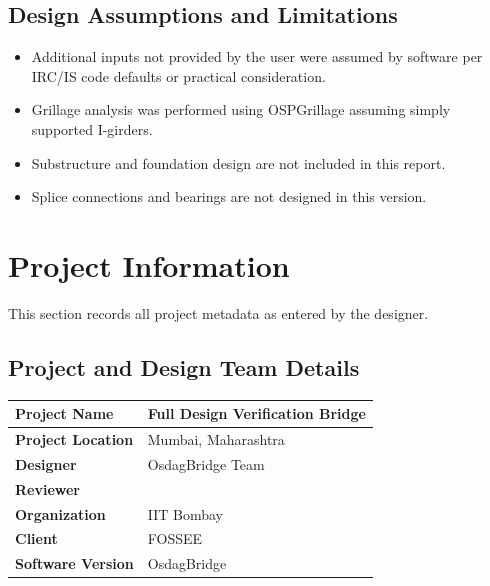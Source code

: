\documentclass[12pt,a4paper]{report}
\numberwithin{table}{chapter}
\numberwithin{figure}{chapter}
\begin{document}
\section*{Design Assumptions and Limitations}
\label{sec:assumptions}

\begin{itemize}
\item Additional inputs not provided by the user were assumed by software per IRC/IS code defaults or practical consideration.
\item Grillage analysis was performed using OSPGrillage assuming simply supported I-girders.
\item Substructure and foundation design are not included in this report.
\item Splice connections and bearings are not designed in this version.
\end{itemize}

\titleformat{\chapter}[block]{\normalfont\Large\bfseries\centering}{\thechapter}{1em}{}
\titlespacing*{\chapter}{0pt}{-30pt}{10pt}


\chapter{Project Information}

This section records all project metadata as entered by the designer.

\section{Project and Design Team Details}
\label{sec:project-details}

\vspace{0.4cm}
\begin{tabular}{|L{5.5cm}|L{8.5cm}|}
\hline
\textbf{Project Name} & Full Design Verification Bridge \\
\hline
\textbf{Project Location} & Mumbai, Maharashtra \\
\hline
\textbf{Designer} & OsdagBridge Team \\
\hline
\textbf{Reviewer} &  \\
\hline
\textbf{Organization} & IIT Bombay \\
\hline
\textbf{Client} & FOSSEE \\
\hline
\textbf{Software Version} & OsdagBridge \\
\hline
\end{tabular}
\end{document}
